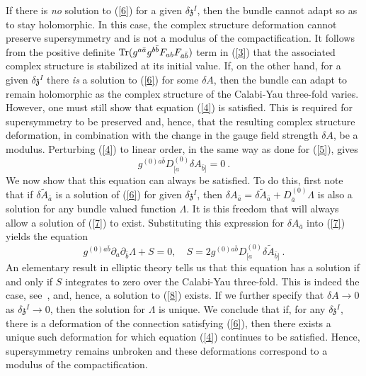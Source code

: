 \documentclass[12pt]{article}
\numberwithin{equation}{section}
\begin{document}
If there is {\it no} solution to (\ref{6}) for a given $\delta {\mathfrak{z}}^{I}$, then the bundle cannot adapt so as to stay holomorphic. In this case, the complex structure deformation cannot preserve supersymmetry and is not a modulus of the compactification. It follows from the positive definite ${\rm Tr}(g^{a{\bar{a}}} g^{b{\bar{b}}} F_{ab}F_{{\bar{a}}{\bar{b}}})$ term in (\ref{3}) that the associated complex structure is stabilized at its initial value. If, on  the other hand, for a given $\delta {\mathfrak{z}}^{I}$ there {\it is} a solution to (\ref{6}) for some $\delta A$, then the bundle can adapt to remain holomorphic as the complex structure of the Calabi-Yau three-fold varies. However, one must still show that equation (\ref{4}) is satisfied. This is required for  supersymmetry to be  preserved and, hence, that the resulting complex structure deformation, in combination with the change in the gauge field strength $\delta A$, be a modulus.
Perturbing (\ref{4}) to linear order, in the same way as done for (\ref{5}), gives
%
\begin{equation}
g^{(0)a{\bar{b}}}D^{(0)}_{[a}\delta A_{{\bar{b}}]}=0 \ .
\label{7}
\end{equation}
%
We now show that this equation can always be satisfied. To do this, first note that if $\delta 
{\tilde{A}} _{{\bar{a}}}$ is a solution of (\ref{6}) for given $\delta {\mathfrak {z}}^{I}$, then $\delta A_{{\bar{a}}}=\delta 
{\tilde{A}} _{{\bar{a}}}+D^{(0)}_{{\bar{a}}}\Lambda$ is also a solution for any bundle valued function $\Lambda$. It is this freedom that will always allow a solution of (\ref{7}) to exist. Substituting this expression for $\delta A_{{\bar{a}}}$ into (\ref{7}) yields the equation
%
\begin{equation}
g^{(0)a {\bar{b}}} \partial_{a} \partial_{\bar{b}} \Lambda+S=0, \quad S=2g^{(0)a{\bar{b}}}D^{(0)}_{[a}\delta {\tilde{A}}_{{\bar{b}}]} \ .
\label{8}
\end{equation}
%
An elementary result in elliptic theory tells us that this equation has a solution if and only if $S$ integrates to zero over the Calabi-Yau three-fold. This is indeed the case, see~\cite{Li:2004hx,Huybrechts}, and, hence, a solution to (\ref{8}) exists. If we further specify that $\delta A \rightarrow 0$ as $\delta{\mathfrak{z}}^{I} \rightarrow 0$, then the solution for $\Lambda$ is unique.
We conclude that if, for any $\delta {\mathfrak{z}}^{I}$, there is a deformation of the connection satisfying (\ref{6}), then there exists a unique such deformation for which equation (\ref{4}) continues to be satisfied. Hence, supersymmetry remains unbroken and these deformations correspond to a modulus of the compactification.
\end{document}
